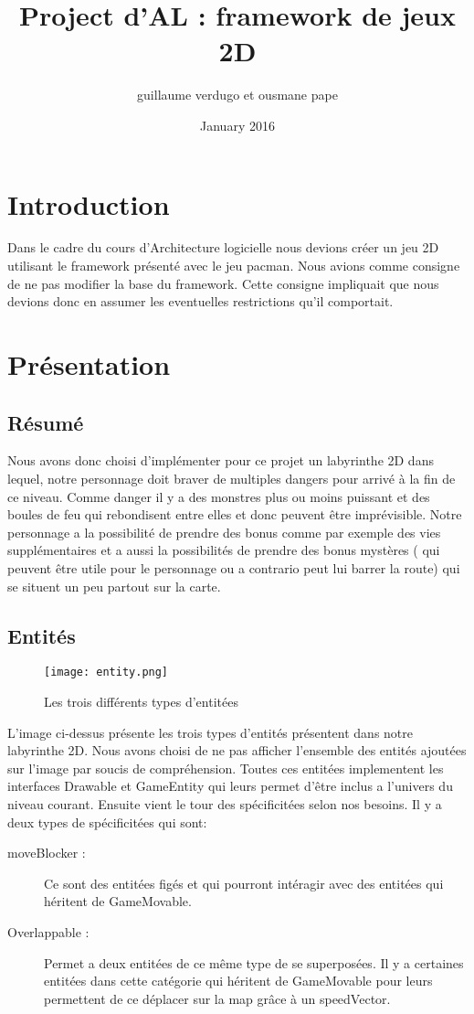 \documentclass{article}
\title{Project d'AL : framework de jeux 2D }
\author{guillaume verdugo et ousmane pape }
\date{January 2016}
\begin{document}
\maketitle
\newpage
\tableofcontents

\newpage
\section{Introduction}


Dans le cadre du cours d'Architecture logicielle nous devions créer un jeu 2D utilisant le framework présenté avec le jeu pacman. Nous avions comme consigne de ne pas modifier la base du framework. Cette consigne impliquait que nous devions donc en assumer les eventuelles restrictions qu'il comportait.

\section{Présentation}

\subsection{Résumé}
Nous avons donc choisi d'implémenter pour ce projet un labyrinthe 2D dans lequel, notre personnage doit braver de multiples dangers pour arrivé à la fin de ce niveau. Comme danger il y a des monstres plus ou moins puissant et des boules de feu qui rebondisent entre elles et donc peuvent être imprévisible. Notre personnage a la possibilité de prendre des bonus comme par exemple des vies supplémentaires et a aussi la possibilités de prendre des bonus mystères ( qui peuvent être utile pour le personnage ou a contrario peut lui barrer la route) qui se situent un peu partout sur la carte.


\subsection{Entités}

\begin{figure}[!h]
\centering
\texttt{[image: entity.png]}
\caption[Entitées]{Les trois différents types d'entitées}
\end{figure}

L'image ci-dessus présente les trois types d'entités présentent dans notre labyrinthe 2D. Nous avons choisi de ne pas afficher l'ensemble des entités ajoutées sur l'image par soucis de compréhension. Toutes ces entitées implementent les interfaces Drawable et GameEntity qui leurs permet d'être inclus a l'univers du niveau courant. Ensuite vient le tour des spécificitées selon nos besoins. Il y a deux types de spécificitées qui sont:
\begin{description}
\item[moveBlocker :] Ce sont des entitées figés et qui pourront intéragir avec des entitées qui héritent de GameMovable. 
\item[Overlappable :] Permet a deux entitées de ce même type de se superposées. Il y a certaines entitées dans cette catégorie qui héritent de GameMovable pour leurs permettent de ce déplacer sur la map grâce à un speedVector.
\end{description}
\end{document}
